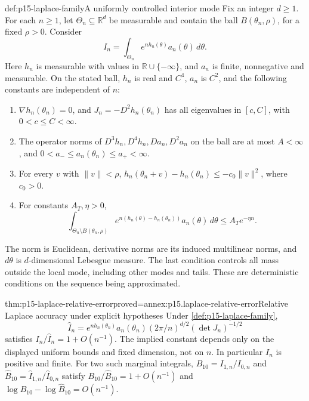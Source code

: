 \begin{hbdefinition}{def:p15-laplace-family}{A uniformly controlled interior mode}
Fix an integer \(d\geq1\). For each \(n\geq1\), let
\(\Theta_n\subseteq\mathbb R^d\) be measurable and contain the ball
\(B(\theta_n,\rho)\), for a fixed \(\rho>0\). Consider
\[
 I_n=\int_{\Theta_n}e^{nh_n(\theta)}a_n(\theta)\,d\theta .
\]
Here \(h_n\) is measurable with values in \(\mathbb R\cup\{-\infty\}\),
and \(a_n\) is finite, nonnegative and measurable. On the stated ball,
\(h_n\) is real and \(C^4\), \(a_n\) is \(C^2\), and the following
constants are independent of \(n\):
\begin{enumerate}
\item \(\nabla h_n(\theta_n)=0\), and
\(J_n=-D^2h_n(\theta_n)\) has all eigenvalues in \([c,C]\), with
\(0<c\leq C<\infty\).
\item The operator norms of \(D^3h_n,D^4h_n,Da_n,D^2a_n\) on the ball
are at most \(A<\infty\), and
\(0<a_-\leq a_n(\theta_n)\leq a_+<\infty\).
\item For every \(v\) with \(\|v\|<\rho\),
\(h_n(\theta_n+v)-h_n(\theta_n)\leq-c_0\|v\|^2\), where \(c_0>0\).
\item For constants \(A_T,\eta>0\),
\[
 \int_{\Theta_n\setminus B(\theta_n,\rho)}
 e^{n(h_n(\theta)-h_n(\theta_n))}a_n(\theta)\,d\theta
 \leq A_Te^{-\eta n}.
\]
\end{enumerate}
The norm is Euclidean, derivative norms are its induced multilinear norms,
and \(d\theta\) is \(d\)-dimensional Lebesgue measure. The last condition
controls all mass outside the local mode, including other modes and tails.
These are deterministic conditions on the sequence being approximated.
\end{hbdefinition}

\begin{hbtheorem}{thm:p15-laplace-relative-error}{proved=annex:p15.laplace-relative-error}{Relative Laplace accuracy under explicit hypotheses}
Under \cref{def:p15-laplace-family},
\[
 \widehat I_n=e^{nh_n(\theta_n)}a_n(\theta_n)
                  (2\pi/n)^{d/2}(\det J_n)^{-1/2}
\]
satisfies \(I_n/\widehat I_n=1+O(n^{-1})\).
The implied constant depends only on the displayed uniform bounds and
fixed dimension, not on \(n\). In particular \(I_n\) is positive and finite.
For two such marginal integrals,
\(B_{10}=I_{1,n}/I_{0,n}\) and
\(\widehat B_{10}=\widehat I_{1,n}/\widehat I_{0,n}\) satisfy
\(B_{10}/\widehat B_{10}=1+O(n^{-1})\) and
\(\log B_{10}-\log\widehat B_{10}=O(n^{-1})\).
\end{hbtheorem}

